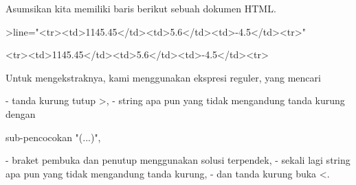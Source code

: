 \documentclass[a4paper,10pt]{article}
\begin{document}
\begin{eulernotebook}
\begin{eulercomment}
\begin{eulercomment}
\begin{eulercomment}
Asumsikan kita memiliki baris berikut sebuah dokumen HTML.
\end{eulercomment}
\begin{eulerprompt}
>line="<tr><td>1145.45</td><td>5.6</td><td>-4.5</td><tr>"
\end{eulerprompt}
\begin{euleroutput}
  <tr><td>1145.45</td><td>5.6</td><td>-4.5</td><tr>
\end{euleroutput}
\begin{eulercomment}
Untuk mengekstraknya, kami menggunakan ekspresi reguler, yang mencari

\end{eulercomment}
\begin{eulerttcomment}
 - tanda kurung tutup >,
 - string apa pun yang tidak mengandung tanda kurung dengan
\end{eulerttcomment}
\begin{eulercomment}
sub-pencocokan "(...)",\\
\end{eulercomment}
\begin{eulerttcomment}
 - braket pembuka dan penutup menggunakan solusi terpendek,
 - sekali lagi string apa pun yang tidak mengandung tanda kurung,
 - dan tanda kurung buka <.
\end{eulerttcomment}
\begin{eulercomment}


\end{eulercomment}
\end{eulercomment}
\end{eulercomment}
\end{eulernotebook}
\end{document}
